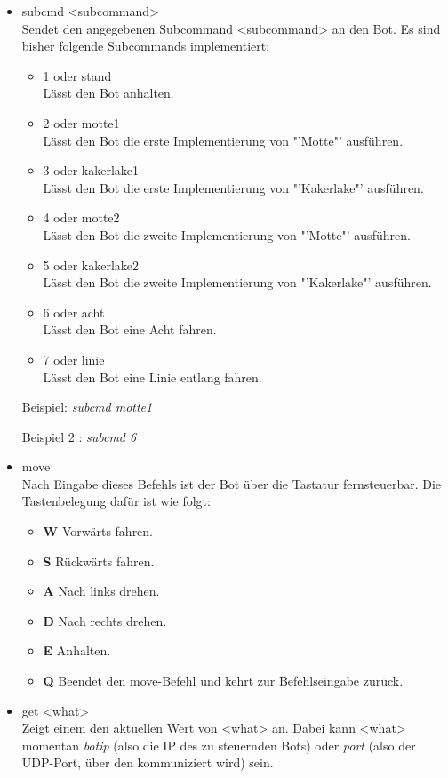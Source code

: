 \begin{itemize}
	\item subcmd <subcommand>\\
	Sendet den angegebenen Subcommand <subcommand> an den Bot. Es sind bisher folgende Subcommands implementiert:
	\begin{itemize}
		\item 1 oder stand\\
		Lässt den Bot anhalten.
   		\item 2 oder motte1\\
   		Lässt den Bot die erste Implementierung von "'Motte"' ausführen.
   		\item 3 oder kakerlake1\\
   		Lässt den Bot die erste Implementierung von "'Kakerlake"' ausführen.
   		\item 4 oder motte2\\
   		Lässt den Bot die zweite Implementierung von "'Motte"' ausführen.
   		\item 5 oder kakerlake2\\
   		Lässt den Bot die zweite Implementierung von "'Kakerlake"' ausführen.
   		\item 6 oder acht\\
   		Lässt den Bot eine Acht fahren.
   		\item 7 oder linie\\
   		Lässt den Bot eine Linie entlang fahren.
	\end{itemize}
	Beispiel: \textit{subcmd motte1}
	
	Beispiel 2 : \textit{subcmd 6}
	\item move\\
	Nach Eingabe dieses Befehls ist der Bot über die Tastatur fernsteuerbar. Die Tastenbelegung dafür ist wie folgt:
	\begin{itemize}
		\item \textbf{W} Vorwärts fahren.
		\item \textbf{S} Rückwärts fahren.
		\item \textbf{A} Nach links drehen.
		\item \textbf{D} Nach rechts drehen.
		\item \textbf{E} Anhalten.
		\item \textbf{Q} Beendet den move-Befehl und kehrt zur Befehlseingabe zurück.
	\end{itemize}
	\item get <what>\\
	Zeigt einem den aktuellen Wert von <what> an. Dabei kann <what> momentan \textit{botip} (also die IP des zu steuernden Bots) oder \textit{port} (also der UDP-Port, über den kommuniziert wird) sein.
	

\end{itemize}
